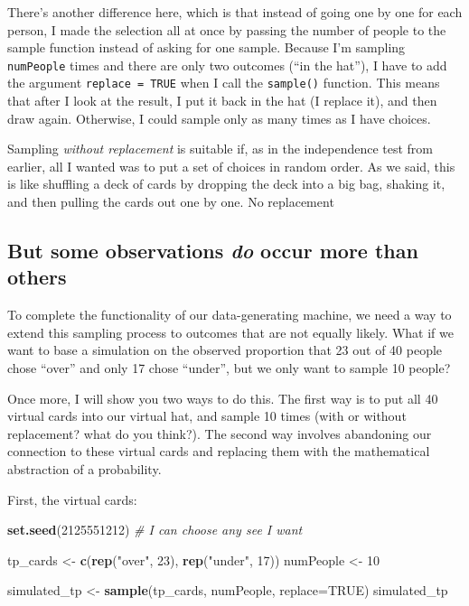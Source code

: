 \documentclass[openany]{book}
\newenvironment{Shaded}{\begin{snugshade}}{\end{snugshade}}
\newcommand{\CommentTok}[1]{\textcolor[rgb]{0.56,0.35,0.01}{\textit{#1}}}
\newcommand{\DataTypeTok}[1]{\textcolor[rgb]{0.13,0.29,0.53}{#1}}
\newcommand{\DecValTok}[1]{\textcolor[rgb]{0.00,0.00,0.81}{#1}}
\newcommand{\KeywordTok}[1]{\textcolor[rgb]{0.13,0.29,0.53}{\textbf{#1}}}
\newcommand{\NormalTok}[1]{#1}
\newcommand{\OtherTok}[1]{\textcolor[rgb]{0.56,0.35,0.01}{#1}}
\newcommand{\StringTok}[1]{\textcolor[rgb]{0.31,0.60,0.02}{#1}}
\begin{document}
There's another difference here, which is that instead of going one by one for each person, I made the selection all at once by passing the number of people to the sample function instead of asking for one sample. Because I'm sampling \texttt{numPeople} times and there are only two outcomes (``in the hat''), I have to add the argument \texttt{replace\ =\ TRUE} when I call the \texttt{sample()} function. This means that after I look at the result, I put it back in the hat (I replace it), and then draw again. Otherwise, I could sample only as many times as I have choices.

Sampling \emph{without replacement} is suitable if, as in the independence test from earlier, all I wanted was to put a set of choices in random order. As we said, this is like shuffling a deck of cards by dropping the deck into a big bag, shaking it, and then pulling the cards out one by one. No replacement

\hypertarget{but-some-observations-do-occur-more-than-others}{%
\subsection*{\texorpdfstring{But some observations \emph{do} occur more than others}{But some observations do occur more than others}}\label{but-some-observations-do-occur-more-than-others}}

To complete the functionality of our data-generating machine, we need a way to extend this sampling process to outcomes that are not equally likely. What if we want to base a simulation on the observed proportion that 23 out of 40 people chose ``over'' and only 17 chose ``under'', but we only want to sample 10 people?

Once more, I will show you two ways to do this. The first way is to put all 40 virtual cards into our virtual hat, and sample 10 times (with or without replacement? what do you think?). The second way involves abandoning our connection to these virtual cards and replacing them with the mathematical abstraction of a probability.

First, the virtual cards:

\begin{Shaded}
\begin{Highlighting}[]
\KeywordTok{set.seed}\NormalTok{(}\DecValTok{2125551212}\NormalTok{) }\CommentTok{# I can choose any see I want}

\NormalTok{tp_cards <-}\StringTok{ }\KeywordTok{c}\NormalTok{(}\KeywordTok{rep}\NormalTok{(}\StringTok{"over"}\NormalTok{, }\DecValTok{23}\NormalTok{), }\KeywordTok{rep}\NormalTok{(}\StringTok{"under"}\NormalTok{, }\DecValTok{17}\NormalTok{))}
\NormalTok{numPeople <-}\StringTok{ }\DecValTok{10}

\NormalTok{simulated_tp <-}\StringTok{ }\KeywordTok{sample}\NormalTok{(tp_cards, numPeople, }\DataTypeTok{replace=}\OtherTok{TRUE}\NormalTok{)}
\NormalTok{simulated_tp}
\end{Highlighting}
\end{Shaded}
\end{document}
